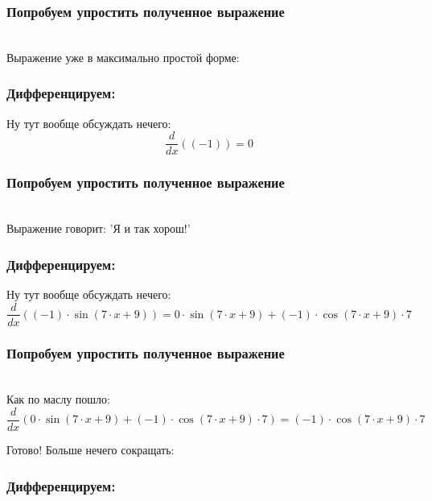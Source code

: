 \documentclass[a4paper,12pt]{article}
\begin{document}
\subsubsection*{Попробуем упростить полученное выражение}
\\Выражение уже в максимально простой форме:

\subsubsection*{Дифференцируем:}

Ну тут вообще обсуждать нечего:
\begin{dmath}\frac{d}{dx}\left((-1)\right)=0\end{dmath}
\subsubsection*{Попробуем упростить полученное выражение}
\\Выражение говорит: 'Я и так хорош!'

\subsubsection*{Дифференцируем:}

Ну тут вообще обсуждать нечего:
\begin{dmath}\frac{d}{dx}\left((-1)\cdot \operatorname{sin}\left(7\cdot x+ 9\right) \right)=0\cdot \operatorname{sin}\left(7\cdot x+ 9\right) + (-1)\cdot \operatorname{cos}\left(7\cdot x+ 9\right) \cdot 7\end{dmath}
\subsubsection*{Попробуем упростить полученное выражение}
\\Как по маслу пошло:\\
\begin{dmath}
	\frac{d}{dx}\left(0\cdot \operatorname{sin}\left(7\cdot x+ 9\right) + (-1)\cdot \operatorname{cos}\left(7\cdot x+ 9\right) \cdot 7\right) = (-1)\cdot \operatorname{cos}\left(7\cdot x+ 9\right) \cdot 7\end{dmath}

Готово! Больше нечего сокращать:

\subsubsection*{Дифференцируем:}
\end{document}
